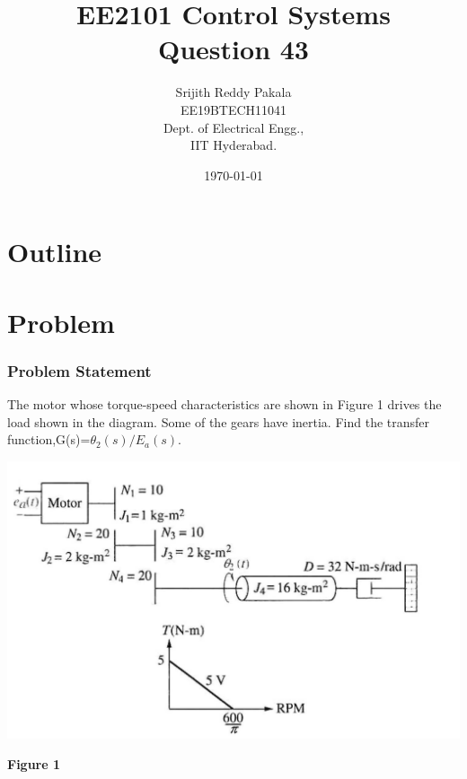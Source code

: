 \documentclass{beamer}
\title{EE2101 Control Systems\\Question 43}
\author{Srijith Reddy Pakala \\EE19BTECH11041\\ Dept. of Electrical Engg.,\\IIT Hyderabad.}
\date{\today}
\numberwithin{equation}{section}
\begin{document}
\begin{frame}
\titlepage
\end{frame}

\section*{Outline}
\begin{frame}
\tableofcontents
\end{frame}
\section{Problem}
\begin{frame}
\frametitle{Problem Statement}
The motor whose torque-speed characteristics are
shown in Figure 1 drives the load shown in the
diagram. Some of the gears have inertia. Find the
transfer function,G(s)=$\theta_2(s)/E_a(s)$.
\begin{center}
\includegraphics[width=0.8\columnwidth]{./figs/EE2101.png} \\
\end{center}
\begin{center}
\textbf{Figure 1} 
\end{center}
\end{frame}
\end{document}
